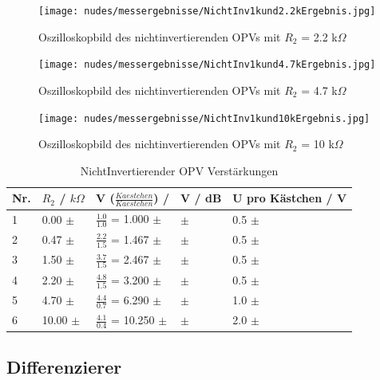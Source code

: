 \documentclass[12pt,a4paper,twoside]{article}
\begin{document}
\begin{figure}[H]
    \centering
    \texttt{[image: nudes/messergebnisse/NichtInv1kund2.2kErgebnis.jpg]}
    \caption{Oszilloskopbild des nichtinvertierenden OPVs mit $R_{2}$ = 2.2 k$\Omega$}
    \label{fig:Nichtinvertierender1k2.2kOszibild}
\end{figure}

\begin{figure}[H]
    \centering
    \texttt{[image: nudes/messergebnisse/NichtInv1kund4.7kErgebnis.jpg]}
    \caption{Oszilloskopbild des nichtinvertierenden OPVs mit $R_{2}$ = 4.7 k$\Omega$}
    \label{fig:Nichtinvertierender1k4.7kOszibild}
\end{figure}

\begin{figure}[H]
    \centering
    \texttt{[image: nudes/messergebnisse/NichtInv1kund10kErgebnis.jpg]}
    \caption{Oszilloskopbild des nichtinvertierenden OPVs mit $R_{2}$ = 10 k$\Omega$}
    \label{fig:Nichtinvertierender1k10kOszibild}
\end{figure}

\begin{table}[H]
    \centering
    \caption{NichtInvertierender OPV Verstärkungen}
    \label{tab:NioVerstärkungenGemessen}
    \begin{tabular}{| l | l | l | l | l |}
        \hline
        Nr. & $R_{2}$ / $k \Omega$ & V ($\frac{Kaestchen}{Kaestchen}$) / & V / dB & U pro Kästchen / V \\
        \hline
        1 &  0.00 $\pm$  & $\frac{1.0}{1.0}$ =  1.000 $\pm$  &  $\pm$  & 0.5 $\pm$  \\
        2 &  0.47 $\pm$  & $\frac{2.2}{1.5}$ =  1.467 $\pm$  &  $\pm$  & 0.5 $\pm$  \\
        3 &  1.50 $\pm$  & $\frac{3.7}{1.5}$ =  2.467 $\pm$  &  $\pm$  & 0.5 $\pm$  \\
        4 &  2.20 $\pm$  & $\frac{4.8}{1.5}$ =  3.200 $\pm$  &  $\pm$  & 0.5 $\pm$  \\
        5 &  4.70 $\pm$  & $\frac{4.4}{0.7}$ =  6.290 $\pm$  &  $\pm$  & 1.0 $\pm$  \\
        6 & 10.00 $\pm$  & $\frac{4.1}{0.4}$ = 10.250 $\pm$  &  $\pm$  & 2.0 $\pm$  \\
        \hline
    \end{tabular}
\end{table}


\subsection{Differenzierer}
\end{document}

